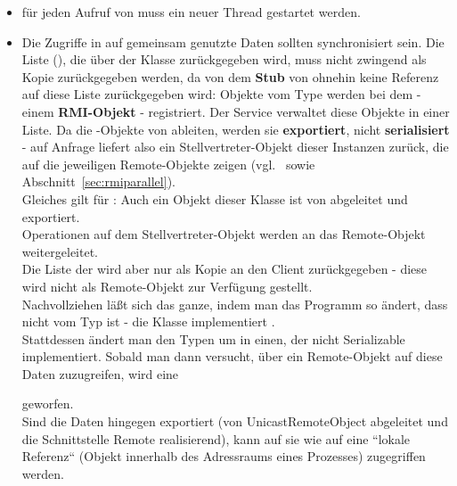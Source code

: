 \begin{itemize}
    \item für jeden Aufruf von  muss ein neuer Thread gestartet werden.
    \item Die Zugriffe in  auf gemeinsam genutzte Daten sollten synchronisiert sein.
    Die Liste (), die über  der Klasse  zurückgegeben wird,
    muss nicht zwingend  als Kopie zurückgegeben werden, da von dem \textbf{Stub} von  ohnehin keine Referenz
    auf diese Liste zurückgegeben wird:
    Objekte vom Type  werden bei dem  - einem \textbf{RMI-Objekt} - registriert.
    Der Service verwaltet diese Objekte in einer Liste.
    Da die -Objekte von  ableiten, werden sie \textbf{exportiert}, nicht \textbf{serialisiert} - auf Anfrage liefert  also ein Stellvertreter-Objekt dieser Instanzen zurück, die auf die jeweiligen Remote-Objekte zeigen (vgl.~\cite[330]{Oec22} sowie Abschnitt~\ref{sec:rmiparallel}).\\
    Gleiches gilt für : Auch ein Objekt dieser Klasse ist von  abgeleitet und exportiert.\\
    Operationen auf dem Stellvertreter-Objekt werden an das Remote-Objekt weitergeleitet.\\
    Die Liste der  wird aber nur als Kopie an den Client zurückgegeben - diese wird nicht als Remote-Objekt zur Verfügung gestellt.\\
    Nachvollziehen läßt sich das ganze, indem man das Programm so ändert, dass  nicht vom Typ  ist - die Klasse implementiert .\\
    Stattdessen ändert man den Typen um in einen, der nicht Serializable implementiert.
    Sobald man dann versucht, über ein Remote-Objekt auf diese Daten zuzugreifen, wird eine \begin{center}\end{center} geworfen.\\
    Sind die Daten hingegen exportiert (von UnicastRemoteObject abgeleitet und die Schnittstelle Remote realisierend), kann auf sie wie auf eine ``lokale Referenz`` (Objekt innerhalb des Adressraums eines Prozesses) zugegriffen werden.
\end{itemize}


